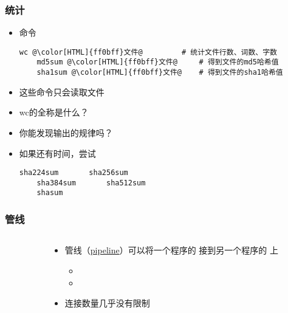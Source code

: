\begin{CJK}{UTF8}{gbsn}
\begin{frame} [fragile]
	\frametitle{统计}
	\linespread{1.25}
	\begin{itemize}
	\item 命令
	\begin{lstlisting}[style=bashstyle, gobble=4, texcl, escapechar=@]
	wc @\color[HTML]{ff0bff}文件@			# 统计文件行数、词数、字数
	md5sum @\color[HTML]{ff0bff}文件@		# 得到文件的md5哈希值
	sha1sum @\color[HTML]{ff0bff}文件@	# 得到文件的sha1哈希值
	\end{lstlisting}
	\item 这些命令只会读取文件
	\item wc的全称是什么？
	\item 你能发现输出的规律吗？
	\item 如果还有时间，尝试 
	\begin{lstlisting}[style=bashstyle, gobble=4, texcl, escapechar=@]
	sha224sum		sha256sum
	sha384sum		sha512sum
	shasum
	\end{lstlisting}
	\end{itemize}
\end{frame}

\begin{frame} [fragile]
	\frametitle{管线}
	\linespread{1.5}
	\begin{columns}[T]
		\begin{column}[T]{.5\textwidth}
			
		\end{column}
		\begin{column}[T]{.5\textwidth}
			\begin{itemize}
			\item 管线（\href{https://en.wikipedia.org/wiki/Pipeline\_(Unix)}
							{pipeline}）可以将一个程序的 
							接到另一个程序的  上
				\begin{itemize}
				\item {}
				\item {}
				\end{itemize}
			\item 连接数量几乎没有限制
			\end{itemize}
		\end{column}
	\end{columns}
\end{frame}


\end{CJK}
